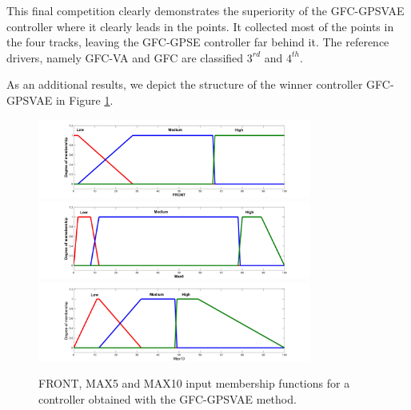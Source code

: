 \documentclass[10pt,journal,compsoc]{IEEEtran}
\begin{document}
This final competition clearly demonstrates the superiority of the {\sf GFC-GPSVAE} controller where it clearly leads in the points. It collected most of the points in the four tracks, leaving the {\sf GFC-GPSE} controller far behind it. The reference drivers, namely {\sf GFC-VA} and {\sf GFC}  are classified $3^{rd}$ and $4^{th}$.



As an additional results, we depict the structure of the winner controller {\sf GFC-GPSVAE} in Figure \ref{fig:frontmfs}. 
%
\begin{figure}[!ht]	
  \begin{center}
    \includegraphics[width=9cm]{fig/FRONT.jpg}
    \includegraphics[width=9cm]{fig/MAX5.jpg}
    \includegraphics[width=9cm]{fig/MAX10.jpg}		
    \caption{FRONT, MAX5 and MAX10 input membership functions for a controller obtained with the {\sf GFC-GPSVAE} method.}
    \label{fig:frontmfs}
\end{center}	
\end{figure}
\end{document}
